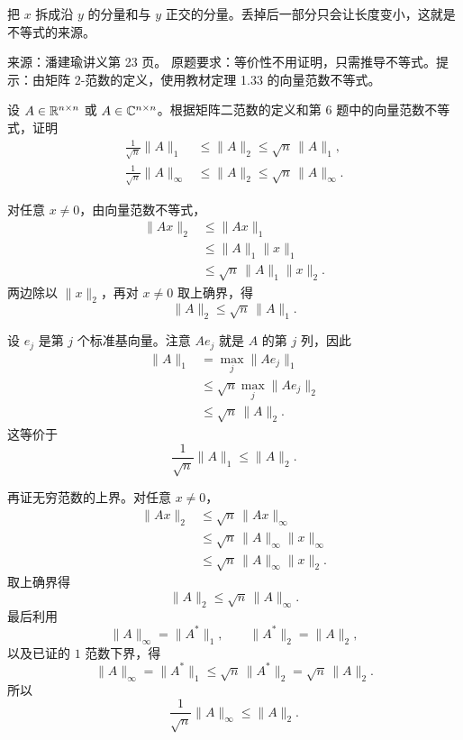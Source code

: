 \begin{dxtips}[证明的本质]\label{hw:matrix:tip7}
把 $x$ 拆成沿 $y$ 的分量和与 $y$ 正交的分量。丢掉后一部分只会让长度变小，这就是不等式的来源。
\end{dxtips}

\begin{homework}[第 8 题：定理 1.38]
\par\smallskip\textsf{来源：潘建瑜讲义第 23 页。}
原题要求：等价性不用证明，只需推导不等式。提示：由矩阵 $2$-范数的定义，使用教材定理 1.33 的向量范数不等式。\par\smallskip

设 $A\in\mathbb{R}^{n\times n}$ 或 $A\in\mathbb{C}^{n\times n}$。根据矩阵二范数的定义和第 6 题中的向量范数不等式，证明
\begin{align*}
\frac1{\sqrt n}\|A\|_1
&\le\|A\|_2\le\sqrt n\,\|A\|_1,\\
\frac1{\sqrt n}\|A\|_\infty
&\le\|A\|_2\le\sqrt n\,\|A\|_\infty.
\end{align*}
\end{homework}

\begin{solution}
对任意 $x\ne0$，由向量范数不等式，
\begin{align*}
\|Ax\|_2
&\le\|Ax\|_1\\
&\le\|A\|_1\|x\|_1\\
&\le\sqrt n\,\|A\|_1\|x\|_2.
\end{align*}
两边除以 $\|x\|_2$，再对 $x\ne0$ 取上确界，得
\[
\|A\|_2\le\sqrt n\,\|A\|_1.
\]

设 $e_j$ 是第 $j$ 个标准基向量。注意 $Ae_j$ 就是 $A$ 的第 $j$ 列，因此
\begin{align*}
\|A\|_1
&=\max_j\|Ae_j\|_1\\
&\le\sqrt n\max_j\|Ae_j\|_2\\
&\le\sqrt n\,\|A\|_2.
\end{align*}
这等价于
\[
\frac1{\sqrt n}\|A\|_1\le\|A\|_2.
\]

再证无穷范数的上界。对任意 $x\ne0$，
\begin{align*}
\|Ax\|_2
&\le\sqrt n\,\|Ax\|_\infty\\
&\le\sqrt n\,\|A\|_\infty\|x\|_\infty\\
&\le\sqrt n\,\|A\|_\infty\|x\|_2.
\end{align*}
取上确界得
\[
\|A\|_2\le\sqrt n\,\|A\|_\infty.
\]
最后利用
\[
\|A\|_\infty=\|A^*\|_1,
\qquad
\|A^*\|_2=\|A\|_2,
\]
以及已证的 $1$ 范数下界，得
\[
\|A\|_\infty
=\|A^*\|_1
\le\sqrt n\,\|A^*\|_2
=\sqrt n\,\|A\|_2.
\]
所以
\[
\frac1{\sqrt n}\|A\|_\infty\le\|A\|_2.
\]
\end{solution}

